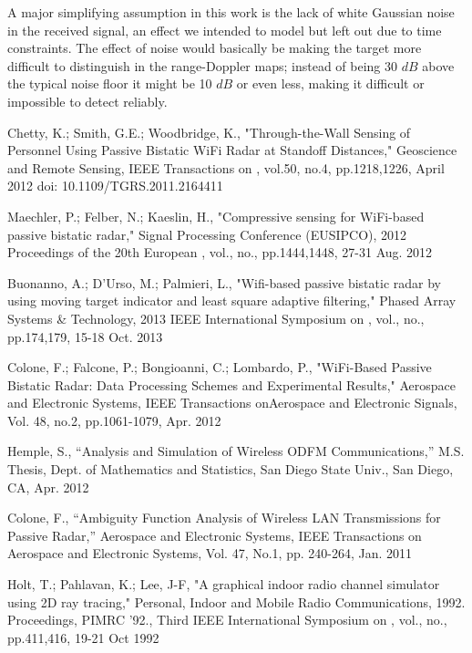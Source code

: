 \documentclass[article,11pt,onecolumn,final]{IEEEtran}
\begin{document}
A major simplifying assumption in this work is the lack of white Gaussian noise in the received signal, an effect we intended to model but left out due to time constraints. The effect of noise would basically be making the target more difficult to distinguish in the range-Doppler maps; instead of being 30 $dB$ above the typical noise floor it might be 10 $dB$ or even less, making it difficult or impossible to detect reliably. 



\begin{thebibliography}{100}

 Chetty, K.; Smith, G.E.; Woodbridge, K., "Through-the-Wall Sensing of Personnel Using Passive
Bistatic WiFi Radar at Standoff Distances," Geoscience and Remote Sensing, IEEE Transactions on ,
vol.50, no.4, pp.1218,1226, April 2012
doi: 10.1109/TGRS.2011.2164411

 Maechler, P.; Felber, N.; Kaeslin, H., "Compressive sensing for WiFi-based passive bistatic radar,"
Signal Processing Conference (EUSIPCO), 2012 Proceedings of the 20th European , vol., no.,
pp.1444,1448, 27-31 Aug. 2012

 Buonanno, A.; D'Urso, M.; Palmieri, L., "Wifi-based passive bistatic radar by using moving target
indicator and least square adaptive filtering," Phased Array Systems \& Technology, 2013 IEEE
International Symposium on , vol., no., pp.174,179, 15-18 Oct. 2013

 Colone, F.; Falcone, P.; Bongioanni, C.; Lombardo, P., "WiFi-Based Passive Bistatic Radar: Data
Processing Schemes and Experimental Results," Aerospace and Electronic Systems, IEEE Transactions
onAerospace and Electronic Signals, Vol. 48, no.2, pp.1061-1079, Apr. 2012

 Hemple, S., “Analysis and Simulation of Wireless ODFM Communications,” M.S. Thesis, Dept. of
Mathematics and Statistics, San Diego State Univ., San Diego, CA, Apr. 2012

 Colone, F., “Ambiguity Function Analysis of Wireless LAN Transmissions for Passive Radar,”
Aerospace and Electronic Systems, IEEE Transactions on Aerospace and Electronic Systems, Vol. 47, No.1,
pp. 240-264, Jan. 2011

 Holt, T.; Pahlavan, K.; Lee, J-F, "A graphical indoor radio channel simulator using 2D ray tracing," Personal, Indoor and Mobile Radio Communications, 1992. Proceedings, PIMRC '92., Third IEEE International Symposium on , vol., no., pp.411,416, 19-21 Oct 1992


\end{thebibliography}
\end{document}
